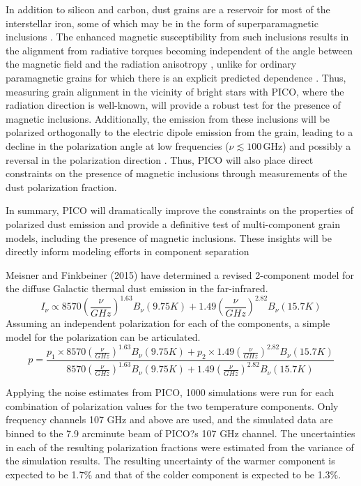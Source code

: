 \documentclass[PICOReport.tex]{subfiles}
\begin{document}
In addition to silicon and carbon, dust grains are a reservoir for most of the interstellar iron, some of which may be in the form of superparamagnetic inclusions \citep{Draine2013}. The enhanced magnetic susceptibility from such inclusions results in the alignment from radiative torques becoming independent of the angle between the magnetic field and the radiation anisotropy \citep{Lazarian2007b,Hoang2015}, unlike for ordinary paramagnetic grains for which there is an explicit predicted dependence \citep{Lazarian2007a}. Thus, measuring grain alignment in the vicinity of bright stars with PICO, where the radiation direction is well-known, will provide a robust test for the presence of magnetic inclusions. Additionally, the emission from these inclusions will be polarized orthogonally to the electric dipole emission from the grain, leading to a decline in the polarization angle at low frequencies ($\nu \lesssim 100$\,GHz) and possibly a reversal in the polarization direction \citep{Draine2013}. Thus, PICO will also place direct constraints on the presence of magnetic inclusions through measurements of the dust polarization fraction.

In summary, PICO will dramatically improve the constraints on the properties of polarized dust emission and provide a definitive test of multi-component grain models, including the presence of magnetic inclusions. These insights will be directly inform modeling efforts in component separation

Meisner and Finkbeiner (2015) have determined a revised 2-component model for the diffuse Galactic thermal dust emission in the
far-infrared.
\begin{equation}
I_\nu \propto 8570\left(\frac{\nu}{GHz}\right)^{1.63} B_\nu(9.75 K) + 1.49 \left(\frac{\nu}{GHz}\right)^{2.82} B_\nu(15.7 K)
\end{equation}
Assuming an independent polarization for each of the components, a simple model for the polarization can be articulated.
\begin{equation}
p=\frac{p_1\times8570\left(\frac{\nu}{GHz}\right)^{1.63} B_\nu(9.75 K) + p_2\times1.49 \left(\frac{\nu}{GHz}\right)^{2.82} B_\nu(15.7 K)}{8570\left(\frac{\nu}{GHz}\right)^{1.63} B_\nu(9.75 K) + 1.49 \left(\frac{\nu}{GHz}\right)^{2.82} B_\nu(15.7 K)}
\end{equation}

Applying the noise estimates from PICO, 1000 simulations
were run for each combination of polarization values
for the two temperature components. Only frequency
channels 107 GHz and above are used, and the simulated
data are binned to the 7.9 arcminute beam of PICO?s
107 GHz channel. The uncertainties in each of the resulting
polarization fractions were estimated from the variance
of the simulation results. The resulting uncertainty of
the warmer component is expected to be 1.7\% and that
of the colder component is expected to be 1.3\%.
\end{document}
